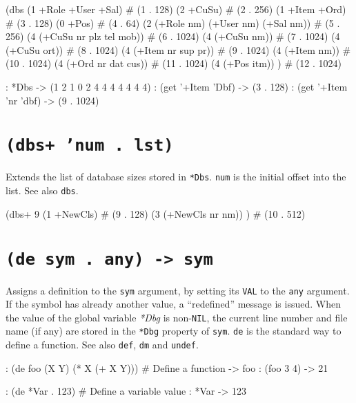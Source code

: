 \begin{wideverbatim}
(dbs
   (1 +Role +User +Sal)                         # (1 . 128)
   (2 +CuSu)                                    # (2 . 256)
   (1 +Item +Ord)                               # (3 . 128)
   (0 +Pos)                                     # (4 . 64)
   (2 (+Role nm) (+User nm) (+Sal nm))          # (5 . 256)
   (4 (+CuSu nr plz tel mob))                   # (6 . 1024)
   (4 (+CuSu nm))                               # (7 . 1024)
   (4 (+CuSu ort))                              # (8 . 1024)
   (4 (+Item nr sup pr))                        # (9 . 1024)
   (4 (+Item nm))                               # (10 . 1024)
   (4 (+Ord nr dat cus))                        # (11 . 1024)
   (4 (+Pos itm)) )                             # (12 . 1024)

: *Dbs
-> (1 2 1 0 2 4 4 4 4 4 4 4)
: (get '+Item 'Dbf)
-> (3 . 128)
: (get '+Item 'nr 'dbf)
-> (9 . 1024)
\end{wideverbatim}

 
\section*{\texttt{(dbs+ 'num . lst)}}
\label{sec:func-ref-D-(dbs+ 'num . lst)}


Extends the list of database sizes stored in \texttt{*Dbs}. \texttt{num} is the
initial offset into the list. See also \texttt{dbs}.


\begin{wideverbatim}
(dbs+ 9
   (1 +NewCls)                                  # (9 . 128)
   (3 (+NewCls nr nm)) )                        # (10 . 512)
\end{wideverbatim}

 
\section*{\texttt{(de sym . any) -> sym}}
\label{sec:func-ref-D-(de sym . any) -> sym}


Assigns a definition to the \texttt{sym} argument, by setting its \texttt{VAL} to the
\texttt{any} argument. If the symbol has already another value, a ``redefined''
message is issued. When the value of the global variable
\emph{*Dbg} is non-\texttt{NIL}, the current line number and file
name (if any) are stored in the \texttt{*Dbg} property of \texttt{sym}. \texttt{de} is the
standard way to define a function. See also \texttt{def}, \texttt{dm} and \texttt{undef}.


\begin{wideverbatim}
: (de foo (X Y) (* X (+ X Y)))  # Define a function
-> foo
: (foo 3 4)
-> 21

: (de *Var . 123)  # Define a variable value
: *Var
-> 123
\end{wideverbatim}

